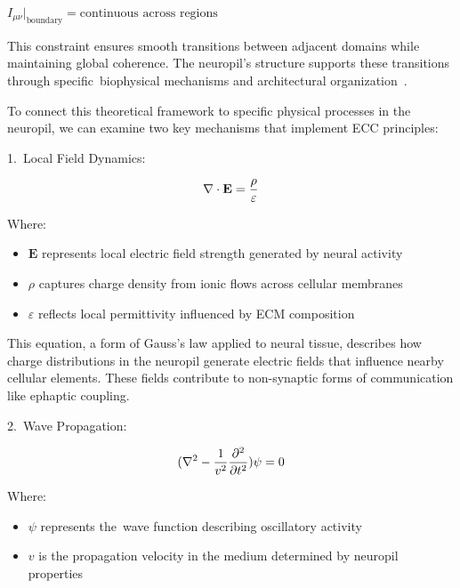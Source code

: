 $I_{\mu\nu}|_{\text{boundary}} = \text{continuous across regions}$

This constraint ensures smooth transitions between adjacent domains while maintaining global coherence. The neuropil's structure supports these transitions through specific~biophysical mechanisms and architectural organization~\cite{Korogod2015, London2005}.

To connect this theoretical framework to specific physical processes in the neuropil, we can examine two key mechanisms that implement ECC principles:

1.~Local Field Dynamics:

\begin{equation}
  \nabla \cdot \mathbf{E} = \frac{\rho}{\varepsilon}
  \myequation{Local field dynamics in neuropil (Gauss's law)}
  \label{eq:neuropil_field}
\end{equation}

Where:
\begin{itemize}
  \item $\mathbf{E}$ represents local electric field strength generated by neural activity
  \item $\rho$ captures charge density from ionic flows across cellular membranes
  \item $\varepsilon$ reflects local permittivity influenced by ECM composition~\cite{Savtchenko2014, hunt2024electromagnetic}
\end{itemize}

This equation, a form of Gauss's law applied to neural tissue, describes how charge distributions in the neuropil generate electric fields that influence nearby cellular elements. These fields contribute to non-synaptic forms of communication like ephaptic coupling.

2.~Wave Propagation:

\begin{equation}
  (\nabla^2 - \frac{1}{v^2}\frac{\partial^2}{\partial t^2})\psi = 0
  \myequation{Wave propagation equation for coherent states in neuropil}
  \label{eq:neuropil_wave}
\end{equation}

Where:
\begin{itemize}
  \item $\psi$ represents the~wave function describing oscillatory activity
  \item $v$ is the propagation velocity in the medium determined by neuropil properties~\cite{Arbib1998, pinotsis2023cytoelectric}
\end{itemize}

